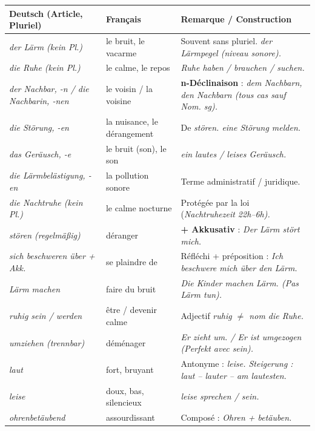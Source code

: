 \documentclass[11pt]{article}
\newcommand{\all}[1]{\ifmmode\text{\textit{#1}}\else\begingroup\selectlanguage{ngerman}\itshape #1\endgroup\fi}
\begin{document}
\begin{propriete}
\begin{center}
\begin{tabularx}{\linewidth}{|X|X|X|}
\hline
\rowcolor{popblueL} \textbf{Deutsch (Article, Pluriel)} & \textbf{Français} & \textbf{Remarque / Construction} \\
\hline
\all{der Lärm} (kein Pl.) & le bruit, le vacarme & Souvent sans pluriel. \all{der Lärmpegel} (niveau sonore). \\
\all{die Ruhe} (kein Pl.) & le calme, le repos & \all{Ruhe haben / brauchen / suchen}. \\
\all{der Nachbar, -n} / \all{die Nachbarin, -nen} & le voisin / la voisine & \textbf{n-Déclinaison} : \all{dem Nachbarn, den Nachbarn} (tous cas sauf Nom. sg). \\
\all{die Störung, -en} & la nuisance, le dérangement & De \all{stören}. \all{eine Störung melden}. \\
\all{das Geräusch, -e} & le bruit (son), le son & \all{ein lautes / leises Geräusch}. \\
\all{die Lärmbelästigung, -en} & la pollution sonore & Terme administratif / juridique. \\
\all{die Nachtruhe} (kein Pl.) & le calme nocturne & Protégée par la loi (\all{Nachtruhezeit} 22h--6h). \\
\hline
\all{stören} (regelmäßig) & déranger & \textbf{+ Akkusativ} : \all{Der Lärm stört mich.} \\
\all{sich beschweren über + Akk.} & se plaindre de & Réfléchi + préposition : \all{Ich beschwere mich über den Lärm.} \\
\all{Lärm machen} & faire du bruit & \all{Die Kinder machen Lärm.} (Pas \all{*Lärm tun}). \\
\all{ruhig sein / werden} & être / devenir calme & Adjectif \all{ruhig} $\neq$ nom \all{die Ruhe}. \\
\all{umziehen} (trennbar) & déménager & \all{Er zieht um.} / \all{Er ist umgezogen} (Perfekt avec \all{sein}). \\
\hline
\all{laut} & fort, bruyant & Antonyme : \all{leise}. Steigerung : \all{laut -- lauter -- am lautesten}. \\
\all{leise} & doux, bas, silencieux & \all{leise sprechen / sein}. \\
\all{ohrenbetäubend} & assourdissant & Composé : \all{Ohren} + \all{betäuben}. \\
\hline
\end{tabularx}
\end{center}
\end{propriete}
\end{document}
